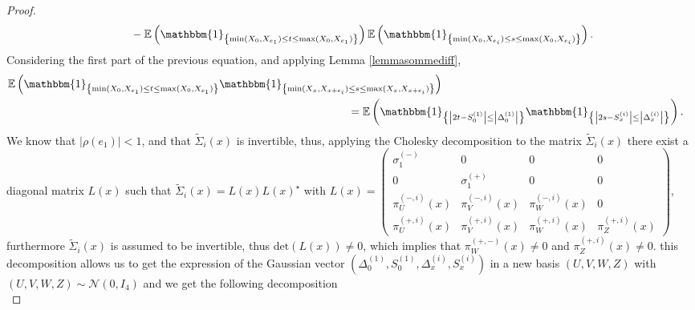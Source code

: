 \documentclass[12pt]{article}
\renewcommand{\tilde}{\widetilde}
\theoremstyle{Theorem}
\theoremstyle{definition}
\begin{document}
\begin{proof}
{\begin{align}
& \hspace{1cm} - \mathbb{E}\left(\mathbbm{1}_{\left\{\min(X_{\scriptscriptstyle 0}, X_{e_1}) \leq t \leq \max(X_{\scriptscriptstyle 0}, X_{e_1})\right\}}\right)\mathbb{E}\left(\mathbbm{1}_{\left\{\min(X_{\scriptscriptstyle 0}, X_{e_i}) \leq s \leq \max(X_{\scriptscriptstyle 0}, X_{e_i})\right\}}\right).
\end{align}}Considering the first part of the previous equation, and applying Lemma \ref{lemmasommediff},
{\small
\begin{align*}
\mathbb{E}\left(\mathbbm{1}_{\left\{\min(X_{\scriptscriptstyle 0}, X_{e_1}) \leq t \leq \max(X_{\scriptscriptstyle 0}, X_{e_1})\right\}}\mathbbm{1}_{\left\{\min(X_{\scriptscriptstyle x}, X_{x+e_i}) \leq s \leq \max(X_{\scriptscriptstyle x}, X_{x+e_i}) \right\}}\right)\\
& \hspace{-3cm}= \mathbb{E}\left(\mathbbm{1}_{\left\{ \left|2t - S^{\scriptscriptstyle (1)}_{\scriptscriptstyle 0}\right| \leq \left|\Delta^{\scriptscriptstyle (1)}_{\scriptscriptstyle 0}\right|\right\}}\mathbbm{1}_{\left\{ \left|2s - S^{\scriptscriptstyle (i)}_{\scriptscriptstyle x}\right| \leq \left|\Delta^{\scriptscriptstyle (i)}_x\right| \right\}}\right).
\end{align*}}We know that $|\rho(e_1)| < 1$, and that $\tilde{\Sigma}_{i}(x)$ is invertible, thus, applying the Cholesky decomposition to the matrix $\tilde{\Sigma}_{i}(x)$ there exist a diagonal matrix $L(x)$ such that $\tilde{\Sigma}_{i}(x) = L(x)L(x)^{\star}$ with $L(x) = \begin{pmatrix} \sigma^{\scriptscriptstyle (-)}_{1} & 0 & 0 & 0 \\
0 & \sigma^{\scriptscriptstyle (+)}_{1} & 0 & 0 \\
\pi^{\scriptscriptstyle(-, i)}_{U}(x) & \pi^{\scriptscriptstyle(-, i)}_{V}(x) & \pi^{\scriptscriptstyle(-, i)}_{W}(x) & 0 \\
\pi^{\scriptscriptstyle(+, i)}_{U}(x) & \pi^{\scriptscriptstyle(+, i)}_{V}(x) & \pi^{\scriptscriptstyle(+, i)}_{W}(x) & \pi^{\scriptscriptstyle(+, i)}_{Z}(x)
  \end{pmatrix}$, furthermore $\tilde{\Sigma}_{i}(x)$ is assumed to be invertible, thus $\text{det}\left(L(x)\right) \neq 0$, which implies that $\pi^{\scriptscriptstyle(+, -)}_{W}(x) \neq 0$ and $\pi^{\scriptscriptstyle(+, i)}_{Z}(x) \neq 0$. this decomposition allows us to get the expression of the Gaussian vector $\left(\Delta^{\scriptscriptstyle (1)}_{\scriptscriptstyle 0},S^{\scriptscriptstyle (1)}_{\scriptscriptstyle 0},\Delta^{\scriptscriptstyle (i)}_{\scriptscriptstyle x},S^{\scriptscriptstyle (i)}_{\scriptscriptstyle x} \right)$ in a new basis $\left(U,V,W,Z\right)$ with $\left(U, V, W, Z\right) \sim \mathcal{N}\left(0,I_{4}\right)$ and we get the following decomposition \\ 

\end{proof}
\end{document}
